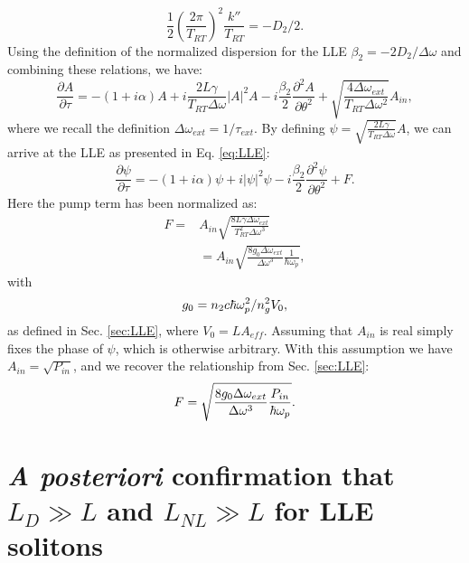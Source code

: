 \begin{equation}
\frac{1}{2}\left(\frac{2\pi}{T_{RT}}\right)^2\frac{k''}{T_{RT}}=-D_2/2.
\end{equation}
Using the definition of the normalized dispersion for the LLE $\beta_2=-2D_2/\Delta\omega$ and combining these relations, we have:
\begin{equation}
\frac{\partial A}{\partial\tau}=-(1+i\alpha)A+i\frac{2L\gamma}{T_{RT}\Delta\omega}|A|^2A-i\frac{\beta_2}{2}\frac{\partial^2 A}{\partial\theta^2} +\sqrt{\frac{4\Delta\omega_{ext}}{T_{RT}\Delta\omega^2}}A_{in},
\end{equation}
where we recall the definition $\Delta\omega_{ext}=1/\tau_{ext}$. By defining $\psi=\sqrt{\frac{2L\gamma}{T_{RT}\Delta\omega}}A$, we can arrive at the LLE as presented in Eq. \ref{eq:LLE}:
\begin{equation}
\frac{\partial \psi}{\partial \tau}=-(1+i \alpha) \psi + i|\psi|^2 \psi -i \frac{\beta_2}{2} \frac{\partial^2 \psi}{\partial \theta^2} +F.
\end{equation}
Here the pump term has been normalized as:
\begin{align}
F=&A_{in}\sqrt{\frac{8 L \gamma \Delta\omega_{ext}}{T_{RT}^2\Delta\omega^3}}\\
&=A_{in}\sqrt{\frac{8g_0\Delta\omega_{ext}}{\Delta\omega^3}\frac{1}{\hbar\omega_p}},
\end{align}
with
\begin{equation}
g_0=n_2 c \hbar \omega_{p}^2/n_g^2 V_0,
\end{equation}
as defined in Sec. \ref{sec:LLE}, where $V_0=L A_{eff}$. Assuming that $A_{in}$ is real simply fixes the phase of $\psi$, which is otherwise arbitrary. With this assumption we have $A_{in}=\sqrt{P_{in}}$, and we recover the relationship from Sec. \ref{sec:LLE}:
\begin{equation}
F=\sqrt{\frac{8 g_0\Delta\omega_{ext}}{\Delta\omega^3}\frac{P_{in}}{\hbar \omega_{p}}}.
\end{equation}

\section{\textit{A posteriori} confirmation that $L_D\gg L$ and $L_{NL}\gg L$ for LLE solitons}

